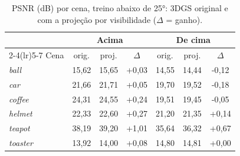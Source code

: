 \begin{table}[t]
\centering
\caption{PSNR (dB) por cena, treino abaixo de 25°: 3DGS original e com a projeção por visibilidade ($\Delta$ = ganho).}
\label{tab:cenas25}
\setlength{\tabcolsep}{4pt}
\begin{tabular}{l ccc ccc}
\toprule
 & \multicolumn{3}{c}{Acima} & \multicolumn{3}{c}{De cima} \\
\cmidrule(lr){2-4}\cmidrule(lr){5-7}
Cena & orig. & proj. & $\Delta$ & orig. & proj. & $\Delta$ \\
\midrule
\textit{ball} & 15{,}62 & 15{,}65 & +0{,}03 & 14{,}55 & 14{,}44 & -0{,}12 \\
\textit{car} & 21{,}66 & 21{,}71 & +0{,}05 & 19{,}70 & 19{,}52 & -0{,}18 \\
\textit{coffee} & 24{,}31 & 24{,}55 & +0{,}24 & 19{,}51 & 19{,}45 & -0{,}05 \\
\textit{helmet} & 22{,}33 & 22{,}60 & +0{,}27 & 21{,}20 & 21{,}35 & +0{,}14 \\
\textit{teapot} & 38{,}19 & 39{,}20 & +1{,}01 & 35{,}64 & 36{,}32 & +0{,}67 \\
\textit{toaster} & 13{,}92 & 14{,}00 & +0{,}08 & 14{,}80 & 14{,}81 & +0{,}00 \\
\bottomrule
\end{tabular}
\end{table}
